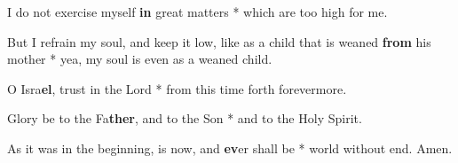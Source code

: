 \begin{multicols}{2}
	I do not exercise myself \textbf{in} great matters * which are too high for me.
	
	But I refrain my soul, and keep it low, like as a child that is weaned \textbf{from} his mother * yea, my soul is even as a weaned child.
	
	O Isra\textbf{el}, trust in the Lord * from this time forth forevermore.
	
	Glory be to the Fa\textbf{ther}, and to the Son * and to the Holy Spirit.
	
	As it was in the beginning, is now, and \textbf{ev}er shall be * world without end. Amen.
\end{multicols}